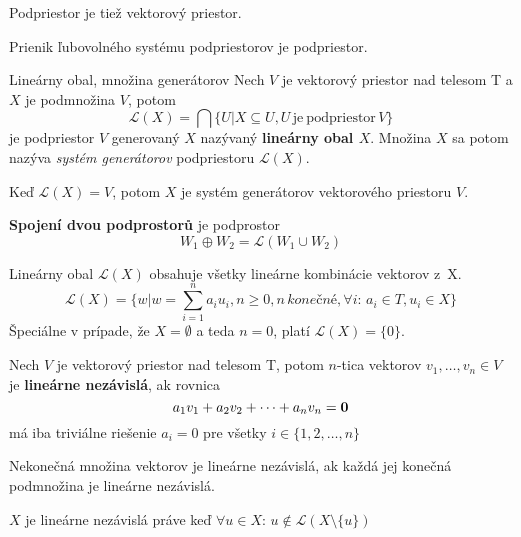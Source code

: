 \begin{pozorovanie}
Podpriestor je tiež vektorový priestor.
\end{pozorovanie}

\begin{vetaSK}
Prienik ľubovolného systému podpriestorov je podpriestor.
\end{vetaSK}

\begin{definiciaN}{Lineárny obal, množina generátorov}
Nech $V$ je vektorový priestor nad telesom T a $X$ je podmnožina $V$, potom 
$$\mathcal{L}(X) = \bigcap\{U|X \subseteq U, U \,\mathrm{je\ podpriestor}\, V\}$$
je podpriestor $V$ generovaný $X$ nazývaný \textbf{lineárny obal $X$}. Množina $X$ sa potom nazýva \emph{systém generátorov} podpriestoru $\mathcal{L}(X)$. 

Keď $\mathcal{L}(X)=V$, potom $X$ je systém generátorov vektorového priestoru $V$.
\end{definiciaN}

\begin{definice}
\textbf{Spojení dvou podprostorů} je podprostor
$$W_1 \oplus W_2 = \mathcal{L}(W_1 \cup W_2)$$
\end{definice}

\begin{vetaSK}
Lineárny obal $\mathcal{L}(X)$ obsahuje všetky lineárne kombinácie vektorov z~X.
$$\mathcal{L}(X) = \{w\big|w = \sum_{i=1}^{n}{a_{i}u_{i}}, n \geq 0, n \,\mathrm{\textit{konečné}}, \forall i: \, a_{i} \in T, u_{i} \in X\}$$
Špeciálne v prípade, že $X=\emptyset$ a teda $n=0$, platí $\mathcal{L}(X)=\{0\}$.
\end{vetaSK}

\begin{definicia}
Nech $V$ je vektorový priestor nad telesom T, potom $n$-tica vektorov $v_{1}, \dots ,v_{n} \in V$ je \textbf{lineárne nezávislá}, ak rovnica
$$a_{1}v_{1} + a_{2}v_{2} + \dots + a_{n}v_{n} = {\bf 0}$$
má iba triviálne riešenie $a_{i} = 0$ pre všetky $i \in \{1, 2, \dots, n\}$

Nekonečná množina vektorov je lineárne nezávislá, ak každá jej konečná podmnožina je lineárne nezávislá.
\end{definicia}

\begin{pozorovanie}
$X$ je lineárne nezávislá práve keď $\forall u \in X: \, u \not\in \mathcal{L}(X \setminus \{u\})$
\end{pozorovanie}

